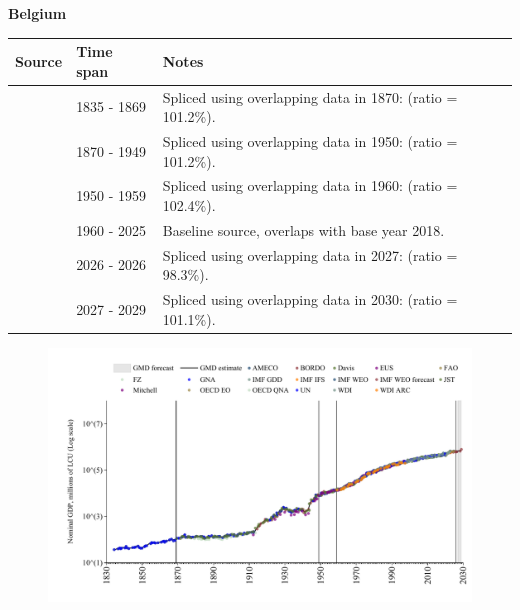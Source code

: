 \documentclass[12pt,a4paper,landscape]{article}
\begin{document}
\begin{adjustbox}{max totalsize={\paperwidth}{\paperheight},center}
\begin{minipage}[t][\textheight][t]{\textwidth}
\vspace*{0.5cm}
{}
\begin{center}
{\Large\bfseries Belgium}
\end{center}
\vspace{0.5cm}
\begin{table}[H]
\centering
\small
\begin{tabular}{|l|l|l|}
\hline
\textbf{Source} & \textbf{Time span} & \textbf{Notes} \\
\hline
\rowcolor{white}\cite{GNA}& 1835 - 1869 &Spliced using overlapping data in 1870: (ratio = 101.2\%).\\
\rowcolor{lightgray}\cite{JST}& 1870 - 1949 &Spliced using overlapping data in 1950: (ratio = 101.2\%).\\
\rowcolor{white}\cite{IMF_GDD}& 1950 - 1959 &Spliced using overlapping data in 1960: (ratio = 102.4\%).\\
\rowcolor{lightgray}\cite{OECD_EO}& 1960 - 2025 &Baseline source, overlaps with base year 2018.\\
\rowcolor{white}\cite{AMECO}& 2026 - 2026 &Spliced using overlapping data in 2027: (ratio = 98.3\%).\\
\rowcolor{lightgray}\cite{IMF_WEO_forecast}& 2027 - 2029 &Spliced using overlapping data in 2030: (ratio = 101.1\%).\\
\hline
\end{tabular}
\end{table}
\begin{figure}[H]
\centering
\includegraphics[width=\textwidth,height=0.6\textheight,keepaspectratio]{graphs/BEL_nGDP.pdf}
\end{figure}
\end{minipage}
\end{adjustbox}
\end{document}
